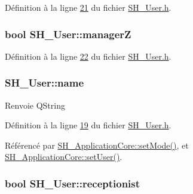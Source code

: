 Définition à la ligne \hyperlink{SH__User_8h_source_l00021}{21} du fichier \hyperlink{SH__User_8h_source}{S\-H\-\_\-\-User.\-h}.

\hypertarget{classSH__User_ad5e987610bea0bd50bbc0a1d1ac0aed5}{
\subsubsection[{manager\-Z}]{\setlength{\rightskip}{0pt plus 5cm}bool S\-H\-\_\-\-User\-::manager\-Z\hspace{0.3cm}{\ttfamily [read]}}}\label{classSH__User_ad5e987610bea0bd50bbc0a1d1ac0aed5}


Définition à la ligne \hyperlink{SH__User_8h_source_l00022}{22} du fichier \hyperlink{SH__User_8h_source}{S\-H\-\_\-\-User.\-h}.

\hypertarget{classSH__User_ae32b20d52e62ec32c1f335006f52214e}{
\subsubsection[{name}]{\setlength{\rightskip}{0pt plus 5cm}S\-H\-\_\-\-User\-::name\hspace{0.3cm}{\ttfamily [read]}}}\label{classSH__User_ae32b20d52e62ec32c1f335006f52214e}
\begin{DoxyReturn}{Renvoie}
Q\-String 
\end{DoxyReturn}


Définition à la ligne \hyperlink{SH__User_8h_source_l00019}{19} du fichier \hyperlink{SH__User_8h_source}{S\-H\-\_\-\-User.\-h}.



Référencé par \hyperlink{classSH__ApplicationCore_a2bfe19528b27831332559d5d2cd24d25}{S\-H\-\_\-\-Application\-Core\-::set\-Mode()}, et \hyperlink{classSH__ApplicationCore_a2dd5c029a2ea348f1dfd0a60dea476e4}{S\-H\-\_\-\-Application\-Core\-::set\-User()}.

\hypertarget{classSH__User_ad9970fff1a6be03101fd87f9c60081ee}{
\subsubsection[{receptionist}]{\setlength{\rightskip}{0pt plus 5cm}bool S\-H\-\_\-\-User\-::receptionist\hspace{0.3cm}{\ttfamily [read]}}}\label{classSH__User_ad9970fff1a6be03101fd87f9c60081ee}


